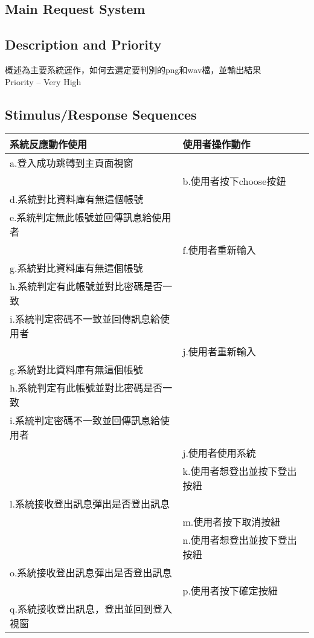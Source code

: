 \documentclass{scrreprt}
\begin{document}
\begin{CJK*}{UTF8}{bsmi}
\section{Main Request System}
\subsection{Description and Priority}
概述為主要系統運作，如何去選定要判別的png和wav檔，並輸出結果\\
Priority – Very High
\subsection{Stimulus/Response Sequences}
\begin{center}
\begin{tabular}{|l|l|}\hline
系統反應動作使用 & 使用者操作動作  \\ \hline
 a.登入成功跳轉到主頁面視窗&   \\ \hline
 & b.使用者按下choose按鈕  \\ \hline
d.系統對比資料庫有無這個帳號 &   \\\hline
e.系統判定無此帳號並回傳訊息給使用者 &   \\\hline
 & f.使用者重新輸入  \\\hline
g.系統對比資料庫有無這個帳號&   \\\hline
h.系統判定有此帳號並對比密碼是否一致&   \\\hline
i.系統判定密碼不一致並回傳訊息給使用者&   \\\hline
 & j.使用者重新輸入  \\\hline
g.系統對比資料庫有無這個帳號&   \\\hline
h.系統判定有此帳號並對比密碼是否一致&   \\\hline
i.系統判定密碼不一致並回傳訊息給使用者&   \\\hline
& j.使用者使用系統  \\\hline
 & k.使用者想登出並按下登出按紐		  \\\hline
l.系統接收登出訊息彈出是否登出訊息&   \\\hline
& m.使用者按下取消按紐	  \\\hline
 & n.使用者想登出並按下登出按紐  \\\hline
o.系統接收登出訊息彈出是否登出訊息&   \\\hline
 & p.使用者按下確定按紐   \\\hline
q.系統接收登出訊息，登出並回到登入視窗&   \\\hline
\end{tabular}
\end{center}

\end{CJK*}
\end{document}
